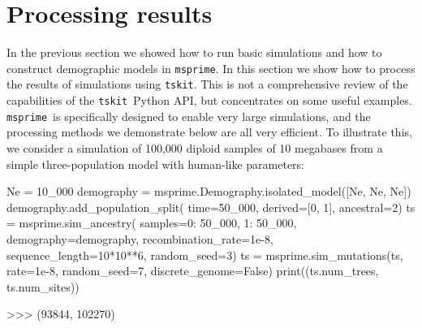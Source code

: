 \documentclass[graybox]{svmult}
\newcommand{\msprime}[0]{\texttt{msprime}}
\newcommand{\tskit}[0]{\texttt{tskit}}
\begin{document}






\section{Processing results}\label{processing-results}

In the previous section we showed how to run basic simulations and
how to construct demographic models in \msprime. In this
section we show how to process the results of simulations using
\tskit. This is not a
comprehensive review of the capabilities of the \tskit\ Python API, but
concentrates on some useful examples.
\msprime\ is specifically designed to enable very large simulations, and
the processing methods we demonstrate below are all very efficient. To
illustrate this, we consider a simulation of 100,000 diploid samples of 10 megabases
from a simple three-population model with human-like parameters:

\begin{pythoncode}
Ne = 10_000
demography = msprime.Demography.isolated_model([Ne, Ne, Ne])
demography.add_population_split(
    time=50_000, derived=[0, 1], ancestral=2)
ts = msprime.sim_ancestry(
    samples={0: 50_000, 1: 50_000},
    demography=demography, recombination_rate=1e-8,
    sequence_length=10*10**6, random_seed=3)
ts = msprime.sim_mutations(ts, rate=1e-8, 
    random_seed=7, discrete_genome=False)
print((ts.num_trees, ts.num_sites))

>>> (93844, 102270)
\end{pythoncode}
\end{document}
